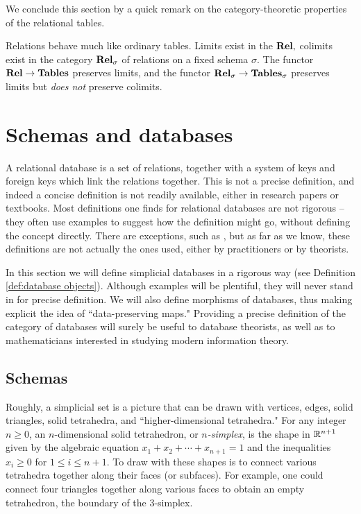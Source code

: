 \documentclass{amsart}
\def\Tables{{\bf Tables}}
\def\Rel{{\bf Rel}}
\begin{document}
We conclude this section by a quick remark on the category-theoretic properties of the relational tables.

\begin{remark}

Relations behave much like ordinary tables.  Limits exist in the $\Rel,$ colimits exist in the category $\Rel_\sigma$ of relations on a fixed schema $\sigma$.  The functor $\Rel\to\Tables$ preserves limits, and the functor $\Rel_\sigma\to\Tables_\sigma$ preserves limits but {\em does not} preserve colimits.

\end{remark}

\section{Schemas and databases}\label{sec:schemas and databases}

A relational database is a set of relations, together with a system of keys and foreign keys which link the relations together.  This is not a precise definition, and indeed a concise definition is not readily available, either in research papers or textbooks.  Most definitions one finds for relational databases are not rigorous -- they often use examples to suggest how the definition might go, without defining the concept directly.  There are exceptions, such as \cite[2.1]{RW}, but as far as we know, these definitions are not actually the ones used, either by practitioners or by theorists.  

In this section we will define simplicial databases in a rigorous way (see Definition \ref{def:database objects}).  Although examples will be plentiful, they will never stand in for precise definition.  We will also define morphisms of databases, thus making explicit the idea of ``data-preserving maps."  Providing a precise definition of the category of databases will surely be useful to database theorists, as well as to mathematicians interested in studying modern information theory.

\subsection{Schemas}\label{subsec:schemas}

Roughly, a simplicial set is a picture that can be drawn with vertices, edges, solid triangles, solid tetrahedra, and ``higher-dimensional tetrahedra."  For any integer $n\geq 0$, an $n$-dimensional solid tetrahedron, or {\em $n$-simplex}, is the shape in ${\mathbb R}^{n+1}$ given by the algebraic equation $x_1+x_2+\cdots+x_{n+1}=1$ and the inequalities $x_i\geq 0$ for $1\leq i\leq n+1$.  To draw with these shapes is to connect various tetrahedra together along their faces (or subfaces).  For example, one could connect four triangles together along various faces to obtain an empty tetrahedron, the boundary of the 3-simplex.
\end{document}
